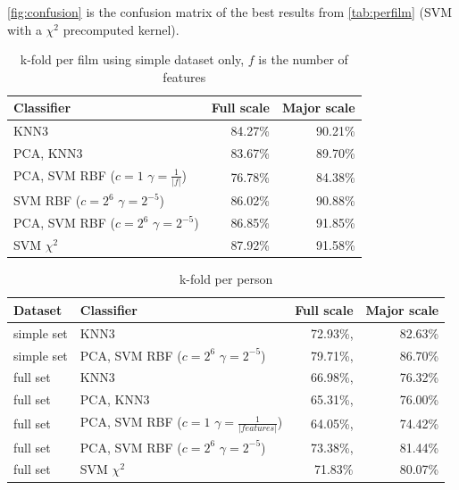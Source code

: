 \autoref{fig:confusion} is the confusion matrix of the best results from \autoref{tab:perfilm} (SVM with a $\chi^2$ precomputed kernel).

\begin{table}
\centering
\begin{tabular}{lrr}
\hline\hline
Classifier 				&  	Full scale	& Major scale	\\
\hline
KNN3 		&  	84.27\%		& 90.21\%		\\
PCA, KNN3 	& 	83.67\%		& 89.70\%		\\
PCA, SVM RBF ($c=1$ $\gamma=\frac{1}{|f|}$)	& 	76.78\%		& 84.38\%		\\
SVM RBF ($c=2^6$ $\gamma=2^{-5}$) & 86.02\% & 90.88\% \\
PCA, SVM RBF ($c=2^6$ $\gamma=2^{-5}$) &  86.85\% & 91.85\% \\
SVM $\chi^2$ & 87.92\% 		& 91.58\% \\
\hline
\end{tabular}
\caption{k-fold per film using simple dataset only, $f$ is the number of features}
\label{tab:perfilm}
\end{table}


\begin{table}
\centering
\begin{tabular}{llrr}
\hline\hline
Dataset & Classifier 				&  	Full scale	& Major scale	\\
\hline
simple set	& KNN3	& 72.93\%, & 82.63\%	\\
simple set	& PCA, SVM RBF ($c=2^6$ $\gamma=2^{-5}$) & 79.71\%, & 86.70\%	\\
full set	& KNN3 & 66.98\%, & 76.32\%	\\
full set	& PCA, KNN3 & 65.31\%, & 76.00\%	\\
full set	& PCA, SVM RBF ($c=1$ $\gamma=\frac{1}{|features|}$) & 64.05\%, & 74.42\%	\\
full set	& PCA, SVM RBF ($c=2^6$ $\gamma=2^{-5}$)& 73.38\%, & 81.44\%	\\
full set    & SVM $\chi^2$ &  71.83\% &80.07\% \\
\hline
\end{tabular}
\caption{k-fold per person}
\label{tab:perperson}
\end{table}


